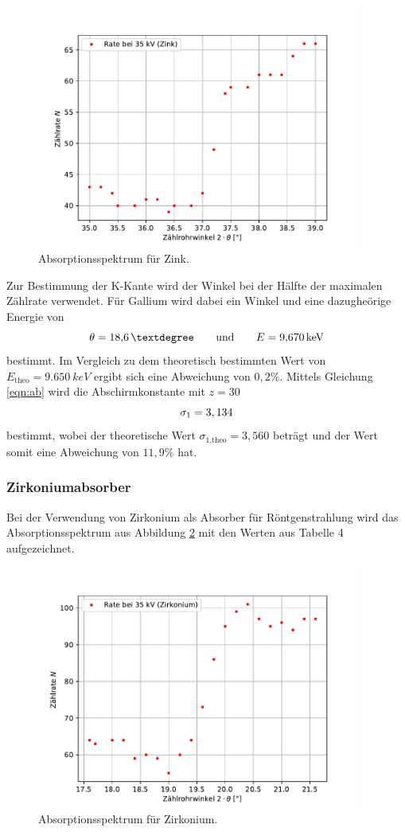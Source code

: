 \begin{figure}[H]
    \centering
    \includegraphics[height=8cm]{Auswertung/Zink.pdf}
    \caption{Absorptionsspektrum für Zink.}
    \label{fig:Zink}
\end{figure}

Zur Bestimmung der K-Kante wird der Winkel bei der Hälfte der maximalen Zählrate verwendet.
Für Gallium wird dabei ein Winkel und eine dazugheörige Energie von
\begin{equation}
    \theta = \SI{18.6}{°} \qquad \text{und} \qquad E = \SI{9,670}{keV}  \notag
\end{equation}
bestimmt.
Im Vergleich zu dem theoretisch bestimmten Wert von $E_\text{theo} = \SI{9,650}{keV}$ ergibt sich eine Abweichung von $0,2\%$.
Mittels Gleichung \ref{eqn:ab} wird die Abschirmkonstante mit $z = 30$
\begin{equation}
    \sigma_1 = 3,134   \notag
\end{equation}
bestimmt, wobei der theoretische Wert $\sigma_\text{1,theo} = 3,560$ beträgt und der Wert somit eine Abweichung von $11,9 \%$ hat.

\subsubsection{Zirkoniumabsorber}
Bei der Verwendung von Zirkonium als Absorber für Röntgenstrahlung wird das Absorptionsspektrum aus Abbildung \ref{fig:Zirkonium} mit den Werten aus Tabelle 4 aufgezeichnet.

\begin{figure}[H]
    \centering
    \includegraphics[height=8cm]{Auswertung/Zirkonium.pdf}
    \caption{Absorptionsspektrum für Zirkonium.}
    \label{fig:Zirkonium}
\end{figure}


